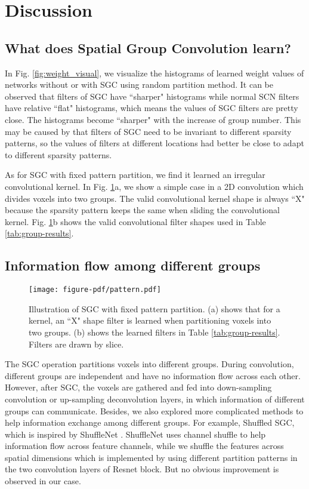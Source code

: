 \documentclass[runningheads]{llncs}
\begin{document}
\section{Discussion}
\subsection{What does Spatial Group Convolution learn?}
In Fig. \ref{fig:weight_visual}, we visualize the histograms of learned weight values of networks without or with SGC using random partition method. It can be observed that filters of SGC have ``sharper" histograms while normal SCN filters have relative ``flat" histograms, which means the values of SGC filters are pretty close. The histograms become ``sharper" with the increase of group number. This may be caused by that filters of SGC need to be invariant to different sparsity patterns, so the values of filters at different locations had better be close to adapt to different sparsity patterns.

As for SGC with fixed pattern partition, we find it learned an irregular convolutional kernel. In Fig. \ref{fig:pattern}a, we show a simple case in a 2D convolution which divides voxels into two groups. The valid convolutional kernel shape is always ``X" because the sparsity pattern keeps the same when sliding the convolutional kernel. Fig. \ref{fig:pattern}b shows the valid convolutional filter shapes used in Table \ref{tab:group-results}.


\subsection{Information flow among different groups}
\begin{figure}[t]
\centering
\texttt{[image: figure-pdf/pattern.pdf]}
\caption{Illustration of SGC with fixed pattern partition. (a) shows that for a  kernel, an ``X" shape filter is learned when partitioning voxels into two groups. (b) shows the learned  filters in Table \ref{tab:group-results}. Filters are drawn by slice.}
\label{fig:pattern}
\end{figure}

The SGC operation partitions voxels into different groups. During convolution, different groups are independent and have no information flow across each other. However, after SGC, the voxels are gathered and fed into down-sampling convolution or up-sampling deconvolution layers, in which information of different groups can communicate. Besides, we also explored more complicated methods to help information exchange among different groups. For example, Shuffled SGC, which is inspired by ShuffleNet \cite{zhang2018shufflenet}. ShuffleNet uses channel shuffle to help information flow across feature channels, while we shuffle the features across spatial dimensions which is implemented by using different partition patterns in the two convolution layers of Resnet block. But no obvious improvement is observed in our case.
\end{document}
